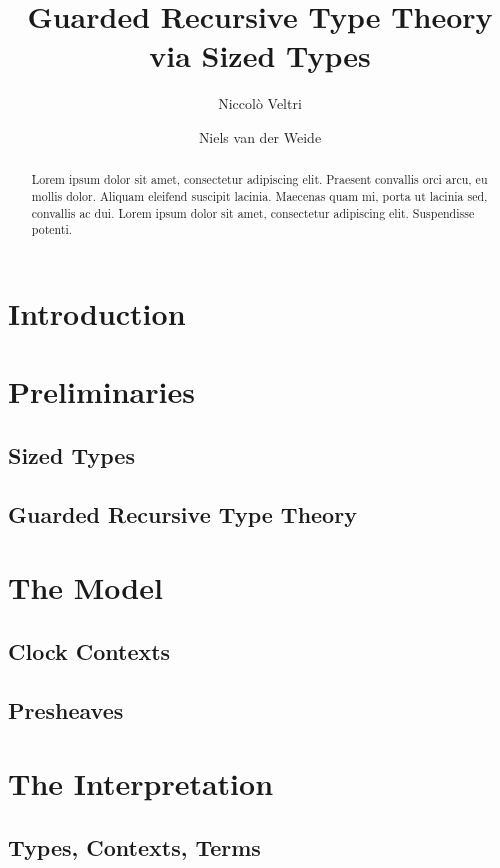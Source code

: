 \documentclass[a4paper,UKenglish]{lipics-v2018}
\title{Guarded Recursive Type Theory via Sized Types}
\author{Niccol\`o Veltri}{Dummy University Computing Laboratory, [Address], Country}{johnqpublic@dummyuni.org}{https://orcid.org/0000-0002-1825-0097}{[funding]}%
\author{Niels van der Weide}{iCIS, Radboud Universiteit, The Netherlands}{nweide@cs.ru.nl}{}{}
\begin{document}
\maketitle

\begin{abstract}
Lorem ipsum dolor sit amet, consectetur adipiscing elit. Praesent convallis orci arcu, eu mollis dolor. Aliquam eleifend suscipit lacinia. Maecenas quam mi, porta ut lacinia sed, convallis ac dui. Lorem ipsum dolor sit amet, consectetur adipiscing elit. Suspendisse potenti. 
 \end{abstract}

\section{Introduction}
\cite{atkey2013productive}

\section{Preliminaries}

\subsection{Sized Types}

\subsection{Guarded Recursive Type Theory}

\section{The Model}

\subsection{Clock Contexts}

\subsection{Presheaves}

\section{The Interpretation}

\subsection{Types, Contexts, Terms}
\end{document}
